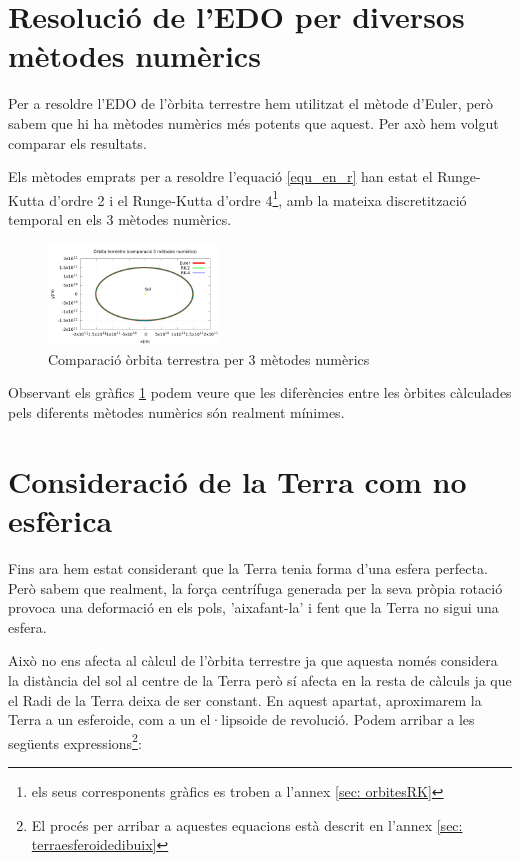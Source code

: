\documentclass[11pt]{article}
\begin{document}
\section{Resolució de l'EDO per diversos mètodes numèrics}\label{sec: edos}
Per a resoldre l'EDO de l'òrbita terrestre hem utilitzat el mètode d'Euler, però sabem que hi ha mètodes numèrics més potents que aquest. Per axò hem volgut comparar els resultats.

Els mètodes emprats per a resoldre l'equació \eqref{equ_en_r} han estat el Runge-Kutta d'ordre 2 i el Runge-Kutta d'ordre 4\footnote{els seus corresponents gràfics es troben a l'annex \ref{sec: orbitesRK}}, amb la mateixa discretització temporal en els 3 mètodes numèrics.

\begin{figure}[H]
    \centering
    \includegraphics[width=0.4\textwidth]{orbita3met.PNG}
    \caption{Comparació òrbita terrestra per 3 mètodes numèrics}
    \label{fig: orbita3met}
\end{figure}

Observant els gràfics \ref{fig: orbita3met} podem veure que les diferències entre les òrbites càlculades pels diferents mètodes numèrics són realment mínimes.

\section{Consideració de la Terra com no esfèrica}\label{sec: terranoesfera}
Fins ara hem estat considerant que la Terra tenia forma d'una esfera perfecta. Però sabem que realment, la força centrífuga generada per la seva pròpia rotació provoca una deformació en els pols, 'aixafant-la' i fent que la Terra no sigui una esfera.

Això no ens afecta al càlcul de l'òrbita terrestre ja que aquesta només considera la distància del sol al centre de la Terra però sí afecta en la resta de càlculs ja que el Radi de la Terra deixa de ser constant. En aquest apartat, aproximarem la Terra a un esferoide, com a un el·lipsoide de revolució. Podem arribar a les següents expressions\footnote{El procés per arribar a aquestes equacions està descrit en l'annex \ref{sec: terraesferoidedibuix}}:
\end{document}
